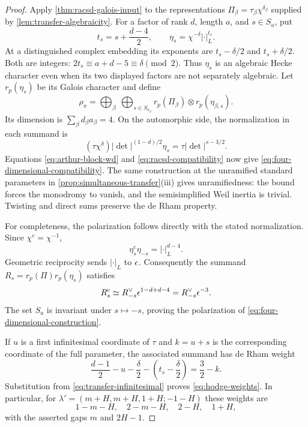 \begin{proof}
Apply \cref{thm:racsd-galois-input} to the representations
$\Pi_\beta=\tau_\beta\chi^{\delta_\beta}$ supplied by
\cref{lem:transfer-algebraicity}.
For a factor of rank $d$, length $a$, and $s\in S_a$, put
\[
 t_s=s+\frac{d-4}{2},\qquad
 \eta_s=\chi^{-\delta}|\cdot|_L^{t_s}.
\]
At a distinguished complex embedding its exponents are
$t_s-\delta/2$ and $t_s+\delta/2$.  Both are integers:
$2t_s\equiv a+d-5\equiv\delta\pmod2$.
Thus $\eta_s$ is an algebraic Hecke character even when its two
displayed factors are not separately algebraic.  Let $r_p(\eta_s)$
be its Galois character and define
\begin{equation}
 \rho_\pi
 =\bigoplus_\beta\ \bigoplus_{s\in S_{a_\beta}}
   r_p(\Pi_\beta)\otimes r_p(\eta_{\beta,s}).
 \label{eq:four-dimensional-construction}
\end{equation}
Its dimension is $\sum_\beta d_\beta a_\beta=4$.
On the automorphic side, the normalization in each summand is
\[
 (\tau\chi^\delta)|\det|^{(1-d)/2}\eta_s
      =\tau|\det|^{s-3/2}.
\]
Equations \eqref{eq:arthur-block-wd} and
\eqref{eq:racsd-compatibility} now give
\cref{eq:four-dimensional-compatibility}.
The same construction at the unramified standard parameters in
\cref{prop:simultaneous-transfer}\textup{(iii)} gives unramifiedness:
the bound forces the monodromy to vanish, and the semisimplified
Weil inertia is trivial.  Twisting and direct sums preserve
the de Rham property.

For completeness, the polarization follows directly with the stated
normalization.  Since $\chi^c=\chi^{-1}$,
\[
 \eta_s^c\eta_{-s}=|\cdot|_L^{d-4}.
\]
Geometric reciprocity sends $|\cdot|_L$ to $\epsilon$.  Consequently
the summand $R_s=r_p(\Pi)r_p(\eta_s)$ satisfies
\[
 R_s^c
   \simeq R_{-s}^{\vee}\epsilon^{1-d+d-4}
   =R_{-s}^{\vee}\epsilon^{-3}.
\]
The set $S_a$ is invariant under $s\mapsto-s$, proving the
polarization of \cref{eq:four-dimensional-construction}.

If $u$ is a first infinitesimal coordinate of $\tau$ and
$k=u+s$ is the corresponding coordinate of the full parameter,
the associated summand has de Rham weight
\[
 \frac{d-1}{2}-u-\frac\delta2
      -\left(t_s-\frac\delta2\right)
     =\frac32-k.
\]
Substitution from \cref{eq:transfer-infinitesimal} proves
\cref{eq:hodge-weights}.  In particular, for
$\lambda'=(m+H,m+H,1+H;-1-H)$ these weights are
\[
 1-m-H,\quad 2-m-H,\quad 2-H,\quad 1+H,
\]
with the asserted gaps $m$ and $2H-1$.
\end{proof}


